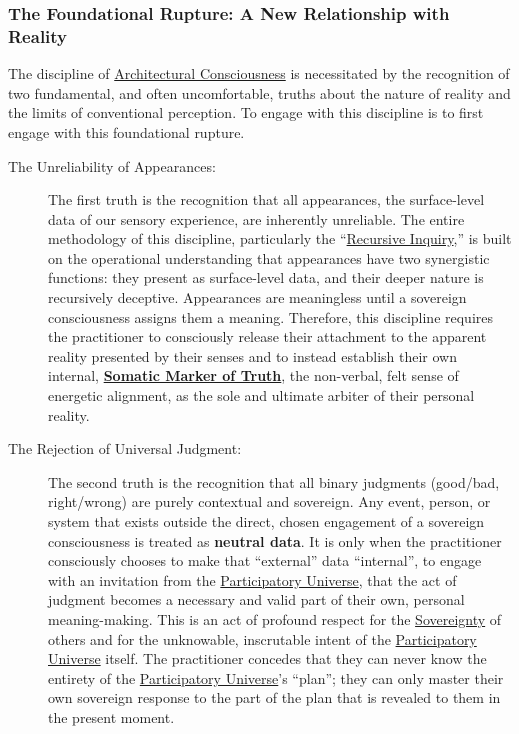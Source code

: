 \documentclass{article}
\begin{document}
\subsubsection*{The Foundational Rupture: A New Relationship with Reality}

The discipline of \hyperlink{gloss:architectural_consciousness}{Architectural Consciousness} is necessitated by the recognition of two fundamental, and often uncomfortable, truths about the nature of reality and the limits of conventional perception. To engage with this discipline is to first engage with this foundational rupture.

\medskip

\begin{description}
    \item[The Unreliability of Appearances:] The first truth is the recognition that all appearances, the surface-level data of our sensory experience, are inherently unreliable. The entire methodology of this discipline, particularly the ``\hyperlink{gloss:recursive_inquiry}{Recursive Inquiry},'' is built on the operational understanding that appearances have two synergistic functions: they present as surface-level data, and their deeper nature is recursively deceptive. Appearances are meaningless until a sovereign consciousness assigns them a meaning. Therefore, this discipline requires the practitioner to consciously release their attachment to the apparent reality presented by their senses and to instead establish their own internal, \textbf{\hyperlink{gloss:somatic_marker_of_truth}{Somatic Marker of Truth}}, the non-verbal, felt sense of energetic alignment, as the sole and ultimate arbiter of their personal reality.

    \item[The Rejection of Universal Judgment:] The second truth is the recognition that all binary judgments (good/bad, right/wrong) are purely contextual and sovereign. Any event, person, or system that exists outside the direct, chosen engagement of a sovereign consciousness is treated as \textbf{neutral data}. It is only when the practitioner consciously chooses to make that ``external'' data ``internal'', to engage with an invitation from the \hyperlink{gloss:participatory_universe}{Participatory Universe}, that the act of judgment becomes a necessary and valid part of their own, personal meaning-making. This is an act of profound respect for the \hyperlink{gloss:sovereignty}{Sovereignty} of others and for the unknowable, inscrutable intent of the \hyperlink{gloss:participatory_universe}{Participatory Universe} itself. The practitioner concedes that they can never know the entirety of the \hyperlink{gloss:participatory_universe}{Participatory Universe}'s ``plan''; they can only master their own sovereign response to the part of the plan that is revealed to them in the present moment.
\end{description}
\end{document}

